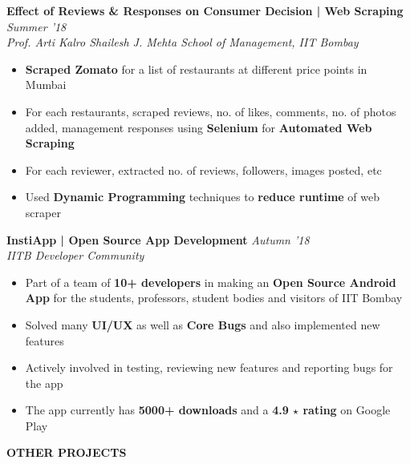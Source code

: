 \documentclass[11pt]{article}%
\begin{document}
{\flushleft \bf \large{Effect of Reviews \& Responses on Consumer Decision | Web Scraping}} \hfill {{{\em{Summer '18}}}} \\
{\em{Prof. Arti Kalro {\textbar} Shailesh J. Mehta School of Management, IIT Bombay}}
\vspace{-1mm}
\begin{itemize}
\setlength\itemsep{0.01em}
\vspace{-1mm}
\item {\bf Scraped Zomato} for a list of restaurants at different price points in Mumbai
\vspace{-1mm}
\item For each restaurants, scraped reviews, no. of likes, comments, no. of photos added, management responses using {\bf Selenium} for {\bf Automated Web Scraping}
\vspace{-1mm}
\item For each reviewer, extracted no. of reviews, followers, images posted, etc
\vspace{-1mm}
\item Used {\bf Dynamic Programming} techniques to {\bf reduce runtime} of web scraper
\end{itemize}
\vspace{-0.5cm}

{\flushleft \bf \large{InstiApp | Open Source App Development}}   \hfill {{\em{Autumn '18} }}\\
{\em{IITB Developer Community}}
\begin{itemize}
\vspace{-2mm}
\setlength\itemsep{0.01em}
\item Part of a team of {\bf 10+ developers} in making an {\bf Open Source Android App} for the students, professors, student bodies and visitors of IIT Bombay
\vspace{-1.2mm}
\item Solved many {\bf UI/UX} as well as {\bf Core Bugs} and also implemented new features
\vspace{-1.2mm}
\item Actively involved in testing, reviewing new features and reporting bugs for the app
\vspace{-1.2mm}
\item The app currently has {\bf 5000+ downloads} and a {\bf 4.9 $\star$ rating} on Google Play
\end{itemize}
\vspace{-0.5cm}

\vspace{2mm}
\begin{flushleft}
\vspace{0mm}
\bf{\LARGE{O}\Large{THER} \LARGE{P}\Large{ROJECTS}}
\hrulefill
\end{flushleft}
\vspace{-7mm}
\end{document}
